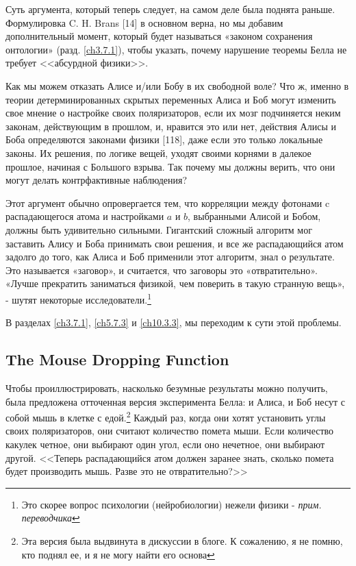 \documentclass[main.tex]{subfiles}
\begin{document}
Суть аргумента, который теперь следует, на самом деле была поднята раньше. Формулировка C. H. Brans [14] в основном верна, но мы добавим дополнительный момент, который будет называться «законом сохранения онтологии» (разд. \ref{ch3.7.1}), чтобы указать, почему нарушение теоремы Белла не требует <<абсурдной физики>>.

Как мы можем отказать Алисе и/или Бобу в их свободной воле? Что ж, именно в теории детерминированных скрытых переменных Алиса и Боб могут изменить свое мнение о настройке своих поляризаторов, если их мозг подчиняется неким законам, действующим в прошлом, и, нравится это или нет, действия Алисы и Боба определяются законами физики [118], даже если это только локальные законы. Их решения, по логике вещей, уходят своими корнями в далекое прошлое, начиная с Большого взрыва. Так почему мы должны верить, что они могут делать контрфактивные наблюдения?

Этот аргумент обычно опровергается тем, что корреляции между фотонами c распадающегося атома и настройками $a$ и $b$, выбранными Алисой и Бобом, должны быть удивительно сильными. Гигантский сложный алгоритм мог заставить Алису и Боба принимать свои решения, и все же распадающийся атом задолго до того, как Алиса и Боб применили этот алгоритм, знал о результате. Это называется «заговор», и считается, что заговоры это «отвратительно». «Лучше прекратить заниматься физикой, чем поверить в такую странную вещь», - шутят некоторые исследователи.\footnote{Это скорее вопрос психологии (нейробиологии) нежели физики - \textit{прим. переводчика}}

В разделах \ref{ch3.7.1}, \ref{ch5.7.3} и \ref{ch10.3.3}, мы переходим к сути этой проблемы.

\subsection{The Mouse Dropping Function}\label{ch3.7}

Чтобы проиллюстрировать, насколько безумные результаты можно получить, была предложена отточенная версия эксперимента Белла: и Алиса, и Боб несут с собой мышь в клетке с едой.\footnote{Эта версия была выдвинута в дискуссии в блоге. К сожалению, я не помню, кто поднял ее, и я не могу найти его основа} Каждый раз, когда они хотят установить углы своих поляризаторов, они считают количество помета мыши. Если количество какулек четное, они выбирают один угол, если оно нечетное, они выбирают другой. <<Теперь распадающийся атом должен заранее знать, сколько помета будет производить мышь. Разве это не отвратительно?>>
\end{document}
